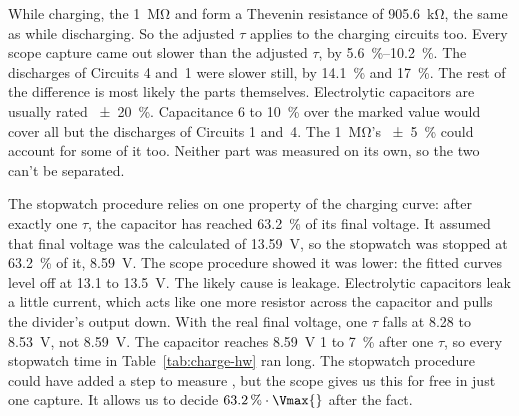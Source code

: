 \documentclass[offwhitecover]{lennylab}
\newcommand{\RC}{\mbox{\(R \cdot C\)}}
\begin{document}
While charging, the \qty{1}{\mega\ohm} and \Rvm{} form a Thevenin resistance of \qty{905.6}{\kilo\ohm}, the same as while discharging. So the adjusted $\tau$ applies to the charging circuits too. Every scope capture came out slower than the adjusted $\tau$, by \qtyrange{5.6}{10.2}{\percent}. The discharges of Circuits 4 and~1 were slower still, by \qty{14.1}{\percent} and \qty{17}{\percent}. The rest of the difference is most likely the parts themselves. Electrolytic capacitors are usually rated \qty{\pm 20}{\percent}. Capacitance 6 to \qty{10}{\percent} over the marked value would cover all but the discharges of Circuits 1 and~4. The \qty{1}{\mega\ohm}'s \qty{\pm 5}{\percent} could account for some of it too. Neither part was measured on its own, so the two can't be separated.

\begin{marginfigure}[-14pt]
  
  \caption{Each circuit's fitted $\tau$ from the scope, charging against discharging, measured from \RC{} (solid) with the meter-adjusted $\tau$ dashed. The orange bar is the gap between the two; the tags give how much longer the discharge took, in seconds and percent.}
  \label{fig:tau-pairs}
\end{marginfigure}%
The stopwatch procedure relies on one property of the charging curve: after exactly one $\tau$, the capacitor has reached \qty{63.2}{\percent} of its final voltage. It assumed that final voltage was the calculated \Vmax{} of \qty{13.59}{\volt}, so the stopwatch was stopped at \qty{63.2}{\percent} of it, \qty{8.59}{\volt}. The scope procedure showed it was lower: the fitted curves level off at 13.1 to \qty{13.5}{\volt}. The likely cause is leakage. Electrolytic capacitors leak a little current, which acts like one more resistor across the capacitor and pulls the divider's output down. With the real final voltage, one $\tau$ falls at 8.28 to \qty{8.53}{\volt}, not \qty{8.59}{\volt}. The capacitor reaches \qty{8.59}{\volt} 1 to \qty{7}{\percent} after one $\tau$, so every stopwatch time in Table~\ref{tab:charge-hw} ran long. The stopwatch procedure could have added a step to measure \Vmax{}, but the scope gives us this for free in just one capture. It allows us to decide $\qty{63.2}{\percent}\cdot\Vmax{}$ after the fact.
\end{document}
